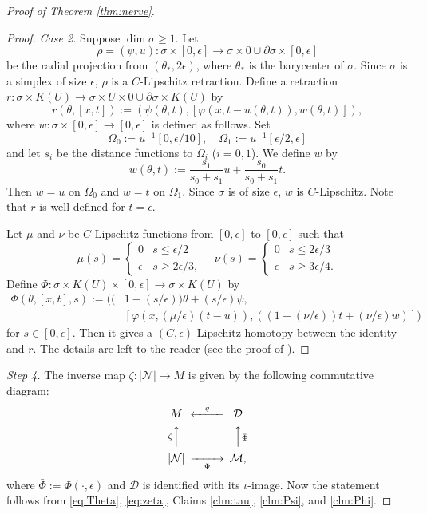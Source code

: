 \documentclass[a4paper,12pt]{amsart}
\theoremstyle{plain}
\theoremstyle{definition}
\numberwithin{thm}{section}
\numberwithin{equation}{section}
\newcommand{\step}[1]{\medskip\noindent\textit{#1.}}
\begin{document}
\begin{proof}[Proof of Theorem \ref{thm:nerve}]
\begin{proof}
\step{Case 2}
Suppose $\dim\sigma\ge 1$.
Let
\[\rho=(\psi,u):\sigma\times [0,\epsilon]\to\sigma\times 0\cup\partial\sigma\times [0,\epsilon]\]
be the radial projection from $(\theta_*,2\epsilon)$, where $\theta_*$ is the barycenter of $\sigma$. 
Since $\sigma$ is a simplex of size $\epsilon$, $\rho$ is a $C$-Lipschitz retraction.
Define a retraction $r:\sigma\times K(U)\to\sigma\times U\times0\cup\partial\sigma\times K(U)$ by
\begin{equation}\label{eq:r}
r(\theta,[x,t]):=(\psi(\theta,t),[\varphi(x,t-u(\theta,t)),w(\theta,t)]),
\end{equation}
where $w:\sigma\times[0,\epsilon]\to[0,\epsilon]$ is defined as follows.
Set
\[\Omega_0:=u^{-1}[0,\epsilon/10],\quad\Omega_1:=u^{-1}[\epsilon/2,\epsilon]\]
and let $s_i$ be the distance functions to $\Omega_i$ ($i=0,1$).
We define $w$ by 
\[w(\theta,t):=\frac{s_1}{s_0+s_1}u+\frac{s_0}{s_0+s_1}t.\]
Then $w=u$ on $\Omega_0$ and $w=t$ on $\Omega_1$.
Since $\sigma$ is of size $\epsilon$, $w$ is $C$-Lipschitz.
Note that $r$ is well-defined for $t=\epsilon$.

Let $\mu$ and $\nu$ be $C$-Lipschitz functions from $[0,\epsilon]$ to $[0,\epsilon]$ such that
\begin{equation*}
\mu(s)=
\begin{cases}
0 & s\le\epsilon/2\\
\epsilon & s\ge2\epsilon/3,
\end{cases}
\quad
\nu(s)=
\begin{cases}
0 & s\le2\epsilon/3\\
\epsilon & s\ge3\epsilon/4.
\end{cases}
\end{equation*}
Define $\Phi:\sigma\times K(U)\times[0,\epsilon]\to\sigma\times K(U)$ by
\begin{align*}
\Phi(\theta,[x,t],s):=((&1-(s/\epsilon))\theta+(s/\epsilon)\psi,\\
&[\varphi(x,(\mu/\epsilon)(t-u)),((1-(\nu/\epsilon))t+(\nu/\epsilon)w)])
\end{align*}
for $s\in[0,\epsilon]$.
Then it gives a $(C,\epsilon)$-Lipschitz homotopy between the identity and $r$.
The details are left to the reader (see the proof of \cite[3.6]{MY:lip}).
\end{proof}

\step{Step 4}
The inverse map $\zeta:|\mathcal N|\to M$ is given by the following commutative diagram:
\begin{equation}\label{eq:zeta}
\begin{CD}
M @<q << \mathcal D \\
@A\zeta AA @AA\bar\Phi A \\
|\mathcal N| @>>\Psi> \mathcal M,
\end{CD}
\end{equation}
where $\bar\Phi:=\Phi(\cdot,\epsilon)$ and $\mathcal D$ is identified with its $\iota$-image.
Now the statement follows from \eqref{eq:Theta}, \eqref{eq:zeta}, Claims \ref{clm:tau}, \ref{clm:Psi}, and \ref{clm:Phi}.
\end{proof}
\end{document}
